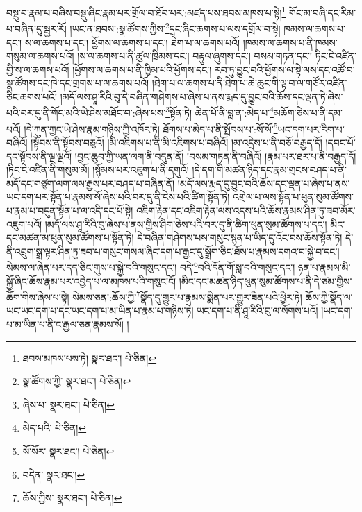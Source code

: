 བསྡུ་བ་རྣམ་པ་བཞིས་བསྡུ་ཞིང་རྣམ་པར་གྲོལ་བ་ཐོབ་པར་:མཛད་པས་ཐབས་མཁས་པ་སྟེ།\footnote{ཐབས་མཁས་པས་ཏེ།  སྣར་ཐང་།  པེ་ཅིན། } གོང་མ་བཞི་དང་རིམ་པ་བཞིན་དུ་སྦྱར་རོ། །ཡང་ན་ཐབས་:སྣ་ཚོགས་ཀྱིས་\footnote{སྣ་ཚོགས་ཀྱི་  སྣར་ཐང་།  པེ་ཅིན། }དྲང་ཞིང་ཆགས་པ་ལས་དགྲོལ་བ་སྟེ། ཁམས་ལ་ཆགས་པ་དང་། ས་ལ་ཆགས་པ་དང་། ཕྱོགས་ལ་ཆགས་པ་དང་། ཐེག་པ་ལ་ཆགས་པའོ། །ཁམས་ལ་ཆགས་པ་ནི་ཁམས་གསུམ་ལ་ཆགས་པའོ། །ས་ལ་ཆགས་པ་ནི་ཚུལ་ཁྲིམས་དང་། བརྟུལ་ཞུགས་དང་། བསམ་གཏན་དང་། ཏིང་ངེ་འཛིན་གྱི་ས་ལ་ཆགས་པའོ། །ཕྱོགས་ལ་ཆགས་པ་ནི་ཁྱིམ་པའི་ཕྱོགས་དང་། རབ་ཏུ་བྱུང་བའི་ཕྱོགས་ལ་སྟེ་ལས་དང་འཚོ་བ་སྣ་ཚོགས་དང་ཁེ་དང་གྲགས་པ་ལ་ཆགས་པའོ། །ཐེག་པ་ལ་ཆགས་པ་ནི་ཐེག་པ་ཆེ་ཆུང་གི་ལྟ་བ་ལ་གཙོར་འཛིན་ཅིང་ཆགས་པའོ། །མདོ་ལས་ཤཱ་རིའི་བུ་དེ་བཞིན་གཤེགས་པ་ཞེས་པ་ནས་རྨད་དུ་བྱུང་བའི་ཆོས་དང་ལྡན་ཏེ་ཞེས་པའི་བར་དུ་ནི་གོང་མའི་ཡེ་ཤེས་མཐོང་བ་:ཞེས་པས་\footnote{ཞེས་པ་  སྣར་ཐང་།  པེ་ཅིན། }སྟོན་ཏེ། ཆེན་པོ་ནི་བླ་ན་:མེད་པ་\footnote{མེད་པའི་  པེ་ཅིན། }མཆོག་ཅེས་པ་ནི་དམ་པའོ། །དེ་ཀུན་ཀྱང་ཡེ་ཤེས་རྣམ་གཉིས་ཀྱི་འཁོར་ཏེ། ཐོགས་པ་མེད་པ་ནི་སྤོབས་པ་:སོ་སོ་\footnote{སོ་སོར་  སྣར་ཐང་།  པེ་ཅིན། }ཡང་དག་པར་རིག་པ་བཞིའོ། །སྟོབས་ནི་སྟོབས་བཅུའོ། །མི་འཇིགས་པ་ནི་མི་འཇིགས་པ་བཞིའོ། །མ་འདྲེས་པ་ནི་བཅོ་བརྒྱད་དོ། །དབང་པོ་དང་སྟོབས་ནི་ལྔ་ལྔའོ། །བྱང་ཆུབ་ཀྱི་ཡན་ལག་ནི་བདུན་ནོ། །བསམ་གཏན་ནི་བཞིའོ། །རྣམ་པར་ཐར་པ་ནི་བརྒྱད་དོ། །ཏིང་ངེ་འཛིན་ནི་གསུམ་མོ། །སྙོམས་པར་འཇུག་པ་ནི་དགུའོ། །དེ་དག་གི་མཚན་ཉིད་དང་རྣམ་གྲངས་བཤད་པ་ནི་མདོ་དང་གཙུག་ལག་ལས་རྒྱས་པར་བཤད་པ་བཞིན་ནོ། །མདོ་ལས་རྨད་དུ་བྱུང་བའི་ཆོས་དང་ལྡན་པ་ཞེས་པ་ནས་ཡང་དག་པར་སྟོན་པ་རྣམས་སོ་ཞེས་པའི་བར་དུ་ནི་ངེས་པའི་ཚིག་སྟོན་ཏེ། འགྲེལ་པ་ལས་སྟོན་པ་ཕུན་སུམ་ཚོགས་པ་རྣམ་པ་བདུན་སྟོན་པ་ལ་འདི་དང་པོ་སྟེ། འཇིག་རྟེན་དང་འཇིག་རྟེན་ལས་འདས་པའི་ཆོས་རྣམས་ཤིན་ཏུ་ཟབ་མོར་འཇུག་པའོ། །མདོ་ལས་ཤཱ་རིའི་བུ་ཞེས་པ་ནས་གྱིས་ཤིག་ཅེས་པའི་བར་དུ་ནི་ཚིག་ཕུན་སུམ་ཚོགས་པ་དང་། མིང་དང་མཚན་མ་ཕུན་སུམ་ཚོགས་པ་སྟོན་ཏེ། དེ་བཞིན་གཤེགས་པས་གསུང་སྙན་པ་ཡིད་དུ་འོང་བས་ཆོས་སྟོན་ཏེ། དེ་ནི་འབྲུག་སྒྲ་ལྟར་ཤིན་ཏུ་ཟབ་པ་གསུང་གསལ་ཞིང་དག་པ་རྒྱང་དུ་སྒྲོག་ཅིང་ཐོས་པ་རྣམས་དགའ་བ་སྐྱེ་བ་དང་། སེམས་ལ་ཞེན་པར་དད་ཅིང་གུས་པ་སྐྱེ་བའི་གསུང་དང་། བདེ་\footnote{བདེན་  སྣར་ཐང་། }བའི་དོན་གོ་སླ་བའི་གསུང་དང་། ཉན་པ་རྣམས་མི་སྐྱོ་ཞིང་ཆོས་རྣམ་པར་འབྱེད་པ་ལ་མཁས་པའི་གསུང་ངོ། །མིང་དང་མཚན་ཉིད་ཕུན་སུམ་ཚོགས་པ་ནི་དེ་ཙམ་གྱིས་ཆོག་གིས་ཞེས་པ་སྟེ། སེམས་ཅན་:ཆོས་ཀྱི་\footnote{ཆོས་ཀྱིས་  སྣར་ཐང་།  པེ་ཅིན། }སྣོད་དུ་གྱུར་པ་རྣམས་སྨིན་པར་གྱུར་ཟིན་པའི་ཕྱིར་ཏེ། ཆོས་ཀྱི་སྣོད་ལ་ཡང་ཡང་དག་པ་དང་ཡང་དག་པ་མ་ཡིན་པ་རྣམ་པ་གཉིས་ཏེ། ཡང་དག་པ་ནི་ཤཱ་རིའི་བུ་ལ་སོགས་པའོ། །ཡང་དག་པ་མ་ཡིན་པ་ནི་ང་རྒྱལ་ཅན་རྣམས་སོ། །
